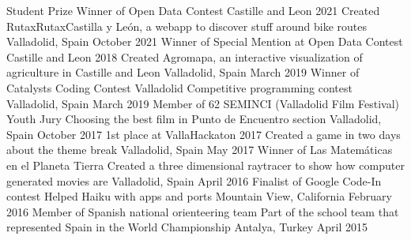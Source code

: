 \documentclass[]{awesome-cv}
\begin{document}
\begin{cvhonors}
    \cvhonor
	{Student Prize Winner of Open Data Contest Castille and Leon 2021}
	{Created RutaxRutaxCastilla y León, a webapp to discover stuff around bike routes}
	{Valladolid, Spain}
	{October 2021}
	\cvhonor
	{Winner of Special Mention at Open Data Contest Castille and Leon 2018}
	{Created Agromapa, an interactive visualization of agriculture in Castille and Leon}
	{Valladolid, Spain}
	{March 2019}
	\cvhonor
	{Winner of Catalysts Coding Contest Valladolid}
	{Competitive programming contest}
	{Valladolid, Spain}
	{March 2019}
	\cvhonor
	{Member of 62 SEMINCI (Valladolid Film Festival) Youth Jury}
	{Choosing the best film in Punto de Encuentro section}
	{Valladolid, Spain}
	{October 2017}
	\cvhonor
	{1st place at VallaHackaton 2017}
	{Created a game in two days about the theme \textquotedbl{}break\textquotedbl{}}
	{Valladolid, Spain}
	{May 2017}
	\cvhonor
	{Winner of \textquotedbl{}Las Matemáticas en el Planeta Tierra\textquotedbl{}}
	{Created a three dimensional raytracer to show how computer generated movies are}
	{Valladolid, Spain}
	{April 2016}
	\cvhonor
	{Finalist of Google Code-In contest}
	{Helped Haiku with apps and ports}
	{Mountain View, California}
	{February 2016}
	\cvhonor
	{Member of Spanish national orienteering team}
	{Part of the school team that represented Spain in the World Championship}
	{Antalya, Turkey}
	{April 2015}
\end{cvhonors}
\ 
\end{document}
